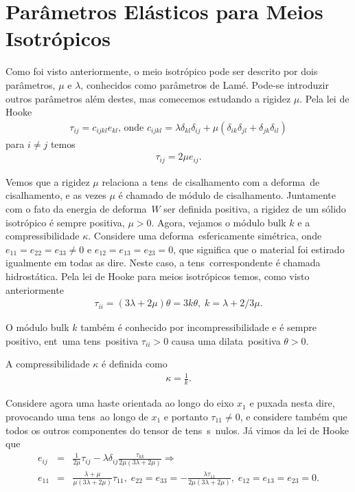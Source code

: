 
\section{Par\^ametros El\'asticos para Meios Isotr\'opicos}

Como foi visto anteriormente, o meio isotr\'opico pode ser descrito por
dois par\^ametros, $\mu$ e $\lambda$, conhecidos como par\^ametros
de Lam\'e. Pode-se introduzir outros
par\^ametros al\'em destes, mas comecemos estudando a rigidez $\mu$.
Pela lei de Hooke
\begin{eqnarray}
\tau_{ij} =
c_{ijkl}e_{kl} \mbox{, onde } c_{ijkl} = \lambda\delta_{kl}\delta_{ij} 
+ \mu(\delta_{ik}\delta_{jl} + \delta_{jk}\delta_{il})
\end{eqnarray}
para $i \neq j$ temos
\begin{eqnarray}
\tau_{ij} = 2\mu e_{ij}.
\end{eqnarray}

Vemos que a rigidez $\mu$ relaciona a tens\ao\ de cisalhamento com a
deforma\cao\ de cisalhamento, e as vezes $\mu$ \'e chamado de m\'odulo
de cisalhamento. Juntamente com o fato da energia de deforma\cao\ $W$
ser definida positiva, a rigidez de um s\'olido isotr\'opico \'e sempre
positiva, $\mu > 0$. Agora, vejamos o m\'odulo bulk $k$ e a
compressibilidade $\kappa$. Considere uma deforma\cao\ esfericamente
sim\'etrica, onde $e_{11}=e_{22}=e_{33} \neq 0$ e
$e_{12}=e_{13}=e_{23}=0$, que significa que o material foi estirado
igualmente em todas as dire\coes. Neste caso, a tens\ao\ correspondente
\'e chamada hidrost\'atica. Pela lei de Hooke para meios isotr\'opicos
temos, como visto anteriormente
\begin{eqnarray}
\tau_{ii} = (3\lambda+2\mu)\theta = 3k\theta, \; k = \lambda + 2/3\mu.
\end{eqnarray}

O m\'odulo bulk $k$ tamb\'em \'e conhecido por incompressibilidade e \'e
sempre positivo, ent\ao\ uma tens\ao\ positiva $\tau_{ii}>0$ causa uma
dilata\cao\ positiva $\theta>0$.

A compressibilidade $\kappa$ \'e definida como
\begin{eqnarray}
\kappa = \frac{1}{k}.
\end{eqnarray}

Considere agora uma haste orientada ao longo do eixo $x_{1}$ e puxada
nesta dire\cao, provocando uma tens\ao\ ao longo de $x_{1}$ e portanto
$\tau_{11} \neq 0$, e considere tamb\'em que todos os outros componentes
do tensor de tens\ao\ s\ao\ nulos. J\'a vimos da lei de Hooke que
\begin{eqnarray}
e_{ij} &=& \frac{1}{2\mu}\tau_{ij} - \lambda\delta_{ij}\frac{\tau_{kk}}{2\mu(3\lambda + 2\mu)} \Longrightarrow \nonumber \\
e_{11} &=& \frac{\lambda + \mu}{\mu(3\lambda+2\mu)}\tau_{11}, \; 
e_{22} = e_{33} = -\frac{\lambda\tau_{11}}{2\mu(3\lambda+2\mu)}, \; e_{12} = e_{13} = e_{23} = 0.
\end{eqnarray}

